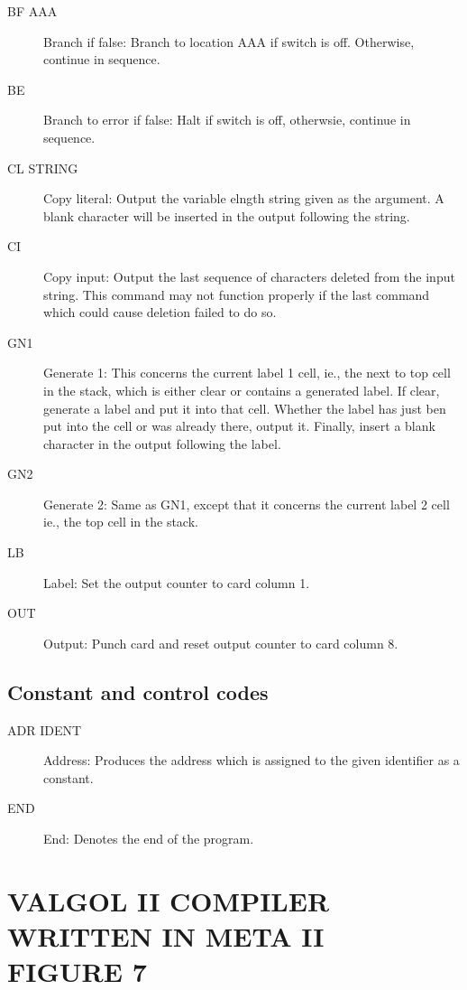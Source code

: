 \documentclass[twocolumn]{article}
\begin{document}
\begin{description}
\item[BF  AAA] Branch if false: Branch to location AAA if switch is off.
Otherwise, continue in sequence.
\item[BE] Branch to error if false: Halt if switch is off, otherwsie,
continue in sequence.
\item[CL  STRING] Copy literal: Output the variable elngth string given as the
argument.
A blank character will be inserted in the output following the string.
\item[CI] Copy input: Output the last sequence of characters deleted from the
input string. This command may not function properly if the last command
which could cause deletion failed to do so.
\item[GN1] Generate 1: This concerns the current label 1 cell, ie., the next
to top cell in the stack, which is either clear or contains a generated label.
If clear, generate a label and put it into that cell.
Whether the label has just ben put into the cell or was already there, output
it.
Finally, insert a blank character in the output following the label.
\item[GN2] Generate 2: Same as GN1, except that it concerns the current label
2 cell ie., the top cell in the stack.
\item[LB] Label: Set the output counter to card column 1.
\item[OUT] Output: Punch card and reset output counter to card column 8.
\end{description}

\subsection{Constant and control codes}
\begin{description}
\item[ADR IDENT] Address: Produces the address which is assigned to the given
identifier as a constant.
\item[END] End: Denotes the end of the program.
\end{description}

\pagebreak

\section{VALGOL II COMPILER WRITTEN IN META II\\FIGURE 7}



\pagebreak
\end{document}
